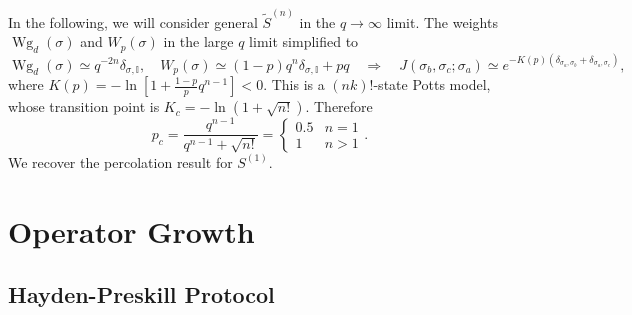 \documentclass[aps,prb,superscriptaddress,nofootinbib]{revtex4}
\begin{document}
In the following, we will consider general $\tilde S^{(n)}$ in the $q\rightarrow \infty$ limit.
The weights $\operatorname{Wg}_{d}(\sigma)$ and $W_p(\sigma)$ in the large $q$ limit simplified to 
\begin{equation}
	\operatorname{Wg}_d(\sigma) \simeq q^{-2n} \delta_{\sigma,\mathbb I},\quad
	W_p(\sigma) \simeq (1-p)q^{n}\delta_{\sigma,\mathbb I}+pq
	\quad\Longrightarrow\quad
	J(\sigma_b,\sigma_c;\sigma_a) \simeq e^{-K(p)(\delta_{\sigma_a,\sigma_b}+\delta_{\sigma_a,\sigma_c})},
\end{equation}
where $K(p) = -\ln\left[1+\frac{1-p}{p}q^{n-1}\right] < 0$.
This is a $(nk)!$-state Potts model, whose transition point is $K_c = -\ln(1+\sqrt{n!})$.
Therefore
\begin{equation}
	p_c = \frac{q^{n-1}}{q^{n-1}+\sqrt{n!}} = \begin{cases}
		0.5 & n=1 \\
		1 & n >1 
	\end{cases}.
\end{equation}
We recover the percolation result for $S^{(1)}$.






\section{Operator Growth}

\subsection{Hayden-Preskill Protocol}

\label{Hayden-Preskill}
\end{document}
